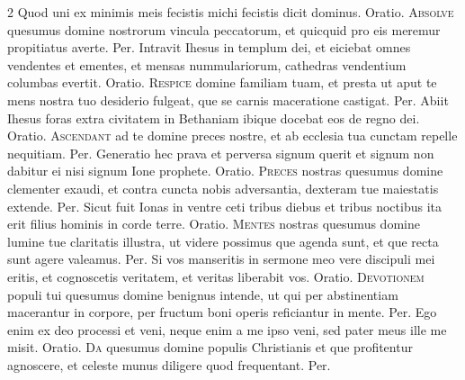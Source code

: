 \begin{multicols*}{2}
 Quod uni ex minimis meis fecistis michi fecistis dicit dominus. {\color{Red} Oratio.}
\lettrine[lines=2]{\zallmancaps \color{Red} A}{bsolve} quesumus domine nostrorum vincula peccatorum, et quicquid pro eis meremur propitiatus averte. Per.
 Intravit Ihesus in templum dei, et eiciebat omnes vendentes et ementes, et mensas nummulariorum, cathedras vendentium columbas evertit. {\color{Red} Oratio.}
\lettrine[lines=2]{\zallmancaps \color{Blue} R}{espice} domine familiam tuam, et presta ut aput te mens nostra tuo desiderio fulgeat, que se carnis maceratione castigat. Per.
 Abiit Ihesus foras extra civitatem in Bethaniam ibique docebat eos de regno dei. {\color{Red} Oratio.}
\lettrine[lines=2]{\zallmancaps \color{Red} A}{scendant} ad te domine preces nostre, et ab ecclesia tua cunctam repelle nequitiam. Per.
 Generatio hec prava et perversa signum querit et signum non dabitur ei nisi signum Ione prophete. {\color{Red} Oratio.}
\lettrine[lines=2]{\zallmancaps \color{Blue} P}{reces} nostras quesumus domine clementer exaudi, et contra cuncta nobis adversantia, dexteram tue maiestatis extende. Per.
 Sicut fuit Ionas in ventre ceti tribus diebus et tribus noctibus ita erit filius hominis in corde terre. {\color{Red} Oratio.}
\lettrine[lines=2]{\zallmancaps \color{Red} M}{entes} nostras quesumus domine lumine tue claritatis illustra, ut videre possimus que agenda sunt, et que recta sunt agere valeamus. Per.
 Si vos manseritis in sermone meo vere discipuli mei eritis, et cognoscetis veritatem, et veritas liberabit vos. {\color{Red} Oratio.}
\lettrine[lines=2]{\zallmancaps \color{Blue} D}{evotionem} populi tui quesumus domine benignus intende, ut qui per abstinentiam macerantur in corpore, per fructum boni operis reficiantur in mente. Per.
 Ego enim ex deo processi et veni, neque enim a me ipso veni, sed pater meus ille me misit. {\color{Red} Oratio.}
\lettrine[lines=2]{\zallmancaps \color{Red} D}{a} quesumus domine populis Christianis et que profitentur agnoscere, et celeste munus diligere quod frequentant. Per.

\end{multicols*}
